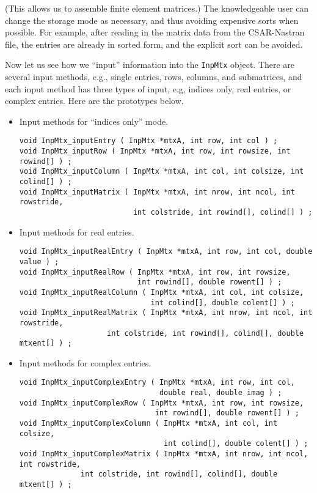 (This allows us to assemble finite element matrices.)
The knowledgeable user can change the storage mode as necessary,
and thus avoiding expensive sorts when possible.
For example, after reading in the matrix data from the CSAR-Nastran 
file,
the entries are already in sorted form, and the explicit sort
can be avoided.
\par
Now let us see how we ``input'' information into the {\tt InpMtx}
object.
There are several input methods, e.g., single entries, rows,
columns, and submatrices, and each input method has three types of
input, e.g, indices only, real entries, or complex entries.
Here are the prototypes below.
\begin{itemize}
\item Input methods for ``indices only'' mode.
\begin{verbatim}
void InpMtx_inputEntry ( InpMtx *mtxA, int row, int col ) ;
void InpMtx_inputRow ( InpMtx *mtxA, int row, int rowsize, int rowind[] ) ;
void InpMtx_inputColumn ( InpMtx *mtxA, int col, int colsize, int colind[] ) ;
void InpMtx_inputMatrix ( InpMtx *mtxA, int nrow, int ncol, int rowstride, 
                          int colstride, int rowind[], colind[] ) ;
\end{verbatim}
\item Input methods for real entries.
\begin{verbatim}
void InpMtx_inputRealEntry ( InpMtx *mtxA, int row, int col, double value ) ;
void InpMtx_inputRealRow ( InpMtx *mtxA, int row, int rowsize, 
                           int rowind[], double rowent[] ) ;
void InpMtx_inputRealColumn ( InpMtx *mtxA, int col, int colsize, 
                              int colind[], double colent[] ) ;
void InpMtx_inputRealMatrix ( InpMtx *mtxA, int nrow, int ncol, int rowstride, 
                    int colstride, int rowind[], colind[], double mtxent[] ) ;
\end{verbatim}
\item Input methods for complex entries.
\begin{verbatim}
void InpMtx_inputComplexEntry ( InpMtx *mtxA, int row, int col, 
                                double real, double imag ) ;
void InpMtx_inputComplexRow ( InpMtx *mtxA, int row, int rowsize, 
                               int rowind[], double rowent[] ) ;
void InpMtx_inputComplexColumn ( InpMtx *mtxA, int col, int colsize, 
                                 int colind[], double colent[] ) ;
void InpMtx_inputComplexMatrix ( InpMtx *mtxA, int nrow, int ncol, int rowstride, 
              int colstride, int rowind[], colind[], double mtxent[] ) ;
\end{verbatim}
\end{itemize}
